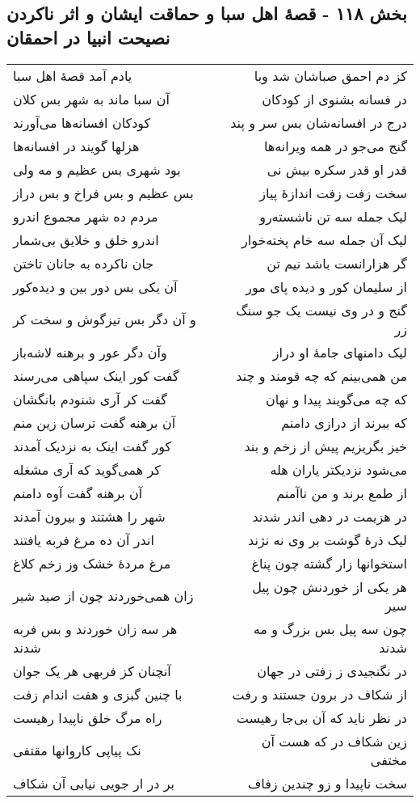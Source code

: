 \begin{center}
\section*{بخش ۱۱۸ - قصهٔ اهل سبا و حماقت ایشان و اثر ناکردن  نصیحت انبیا در احمقان}
\label{sec:sh118}
\begin{longtable}{l p{0.5cm} r}
یادم آمد قصهٔ اهل سبا
&&
کز دم احمق صباشان شد وبا
\\
آن سبا ماند به شهر بس کلان
&&
در فسانه بشنوی از کودکان
\\
کودکان افسانه‌ها می‌آورند
&&
درج در افسانه‌شان بس سر و پند
\\
هزلها گویند در افسانه‌ها
&&
گنج می‌جو در همه ویرانه‌ها
\\
بود شهری بس عظیم و مه ولی
&&
قدر او قدر سکره بیش نی
\\
بس عظیم و بس فراخ و بس دراز
&&
سخت زفت زفت اندازهٔ پیاز
\\
مردم ده شهر مجموع اندرو
&&
لیک جمله سه تن ناشسته‌رو
\\
اندرو خلق و خلایق بی‌شمار
&&
لیک آن جمله سه خام پخته‌خوار
\\
جان ناکرده به جانان تاختن
&&
گر هزارانست باشد نیم تن
\\
آن یکی بس دور بین و دیده‌کور
&&
از سلیمان کور و دیده پای مور
\\
و آن دگر بس تیزگوش و سخت کر
&&
گنج و در وی نیست یک جو سنگ زر
\\
وآن دگر عور و برهنه لاشه‌باز
&&
لیک دامنهای جامهٔ او دراز
\\
گفت کور اینک سپاهی می‌رسند
&&
من همی‌بینم که چه قومند و چند
\\
گفت کر آری شنودم بانگشان
&&
که چه می‌گویند پیدا و نهان
\\
آن برهنه گفت ترسان زین منم
&&
که ببرند از درازی دامنم
\\
کور گفت اینک به نزدیک آمدند
&&
خیز بگریزیم پیش از زخم و بند
\\
کر همی‌گوید که آری مشغله
&&
می‌شود نزدیکتر یاران هله
\\
آن برهنه گفت آوه دامنم
&&
از طمع برند و من ناآمنم
\\
شهر را هشتند و بیرون آمدند
&&
در هزیمت در دهی اندر شدند
\\
اندر آن ده مرغ فربه یافتند
&&
لیک ذرهٔ گوشت بر وی نه نژند
\\
مرغ مردهٔ خشک وز زخم کلاغ
&&
استخوانها زار گشته چون پناغ
\\
زان همی‌خوردند چون از صید شیر
&&
هر یکی از خوردنش چون پیل سیر
\\
هر سه زان خوردند و بس فربه شدند
&&
چون سه پیل بس بزرگ و مه شدند
\\
آنچنان کز فربهی هر یک جوان
&&
در نگنجیدی ز زفتی در جهان
\\
با چنین گبزی و هفت اندام زفت
&&
از شکاف در برون جستند و رفت
\\
راه مرگ خلق ناپیدا رهیست
&&
در نظر ناید که آن بی‌جا رهیست
\\
نک پیاپی کاروانها مقتفی
&&
زین شکاف در که هست آن مختفی
\\
بر در ار جویی نیابی آن شکاف
&&
سخت ناپیدا و زو چندین زفاف
\\
\end{longtable}
\end{center}

